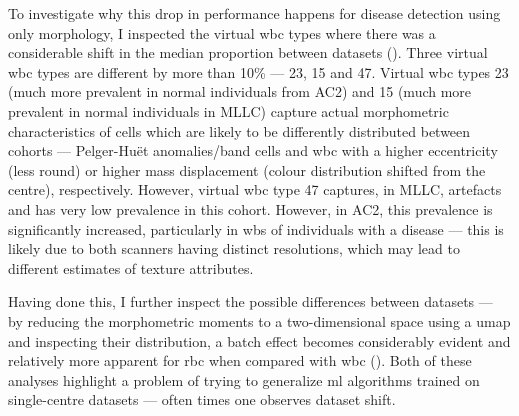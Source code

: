 \begin{figure}[!ht]
    \label{fig:mile-vice-auc-validation}
\end{figure}

To investigate why this drop in performance happens for disease detection using only morphology, I inspected the virtual \ac{wbc} types where there was a considerable shift in the median proportion between datasets (). Three virtual \ac{wbc} types are different by more than 10\% --- 23, 15 and 47. Virtual \ac{wbc} types 23 (much more prevalent in normal individuals from AC2) and 15 (much more prevalent in normal individuals in MLLC) capture actual morphometric characteristics of cells which are likely to be differently distributed between cohorts --- Pelger-Huët anomalies/band cells and \ac{wbc} with a higher eccentricity (less round) or higher mass displacement (colour distribution shifted from the centre), respectively. However, virtual \ac{wbc} type 47 captures, in MLLC, artefacts and has very low prevalence in this cohort. However, in AC2, this prevalence is significantly increased, particularly in \ac{wbs} of individuals with a disease --- this is likely due to both scanners having distinct resolutions, which may lead to different estimates of texture attributes.

\begin{figure}[!ht]
    \label{fig:disease-detection-vcq-comparison}
\end{figure}

Having done this, I further inspect the possible differences between datasets --- by reducing the morphometric moments to a two-dimensional space using a \ac{umap} and inspecting their distribution, a batch effect becomes considerably evident and relatively more apparent for \ac{rbc} when compared with \ac{wbc} (). Both of these analyses highlight a problem of trying to generalize \ac{ml} algorithms trained on single-centre datasets --- often times one observes dataset shift. 


